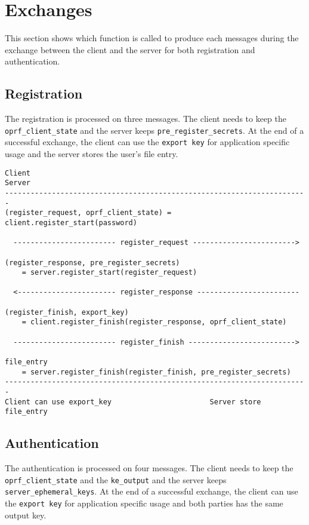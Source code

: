 ﻿\documentclass[../report.tex]{subfiles}
\begin{document}
\section{Exchanges}
This section shows which function is called to produce each messages during the exchange between the client and the server for both registration and authentication.


\subsection{Registration}
The registration is processed on three messages. The client needs to keep the \verb|oprf_client_state| and the server keeps \verb|pre_register_secrets|. At the end of a successful exchange, the client can use the \verb|export key| for application specific usage and the server stores the  user's file entry.


\begin{verbatim}
Client                                                           Server
-----------------------------------------------------------------------
(register_request, oprf_client_state) = client.register_start(password)

  ------------------------ register_request ------------------------>
  
(register_response, pre_register_secrets)
    = server.register_start(register_request)
    
  <----------------------- register_response ------------------------
  
(register_finish, export_key)
    = client.register_finish(register_response, oprf_client_state)
    
  ------------------------ register_finish ------------------------->
  
file_entry 
    = server.register_finish(register_finish, pre_register_secrets)
-----------------------------------------------------------------------
Client can use export_key                       Server store file_entry
\end{verbatim}


\subsection{Authentication}
The authentication is processed on four messages.
The client needs to keep the \verb|oprf_client_state| and the \verb|ke_output| and the server keeps \verb|server_ephemeral_keys|. At the end of a successful exchange, the client can use the \verb|export key| for application specific usage and both parties has the same output key.
\end{document}
